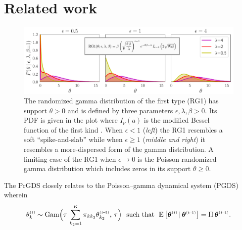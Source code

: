 \documentclass{article}
\begin{document}
\section{Related work}
\label{sec:bg}
\begin{figure}[t]
\centering
\includegraphics[width=\linewidth]{../../fig/distributions/annotated_rg1.pdf}
\caption{\footnotesize \label{fig:rg1} The randomized gamma distribution of the first type (RG1) \cite{yuan2000bessel,makarov2010exact} has support $\theta \!>\!  0$ and is defined by three parameters $\epsilon,\lambda,\beta \!>\! 0$. Its PDF is given in the plot where $I_{\nu}(a)$ is the modified Bessel function of the first kind \cite{abramowitz1965handbook}. When $\epsilon < 1$ (\emph{left}) the RG1 resembles a soft ``spike-and-slab'' while when $\epsilon \geq 1$ (\emph{middle and right}) it resembles a more-dispersed form of the gamma distribution. A limiting case of the RG1 when $\epsilon \!\rightarrow\! 0$ is the Poisson-randomized gamma distribution \cite{zhou2016augmentable} which includes zeros in its support $\theta \geq 0$.~}\vspace{-0.5em}
\end{figure}
The PrGDS closely relates to the Poisson--gamma dynamical system (PGDS)~\citep{schein2016poisson} wherein~\vspace{-0.2em}
\begin{equation}
\label{eq:pgds}
\thetakt \sim \textrm{Gam}\Big(\tau\,\sum_{k_2=1}^K \pi_{kk_2} \thetakttm,\, \tau\Big)\,\,\textrm{ such that }\,\,
% 
\mathbb{E}\left[\boldsymbol{\theta}^{\mathsmaller{(t)}} \given \boldsymbol{\theta}^{\mathsmaller{(t \tm 1)}}\right]= \Pi \, \boldsymbol{\theta}^{\mathsmaller{(t \tm 1)}}.
\end{equation}
\end{document}
